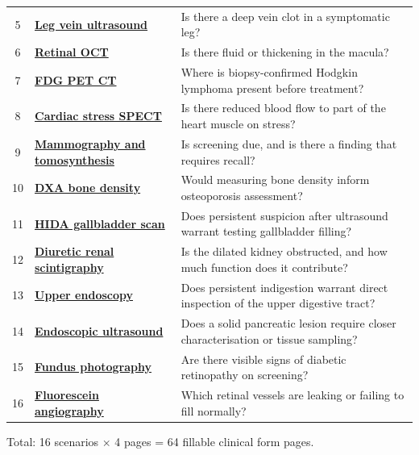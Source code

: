 \documentclass[10pt,a4paper]{article}
\begin{document}
\begin{Form}
\begin{tabularx}{\linewidth}{@{}c >{\bfseries\color{Navy}}p{4.6cm} X@{}}
5 & \hyperlink{scen5}{Leg vein ultrasound} & {\fontsize{8.3}{10}\selectfont Is there a deep vein clot in a symptomatic leg?} \\
6 & \hyperlink{scen6}{Retinal OCT} & {\fontsize{8.3}{10}\selectfont Is there fluid or thickening in the macula?} \\
7 & \hyperlink{scen7}{FDG PET CT} & {\fontsize{8.3}{10}\selectfont Where is biopsy-confirmed Hodgkin lymphoma present before treatment?} \\
8 & \hyperlink{scen8}{Cardiac stress SPECT} & {\fontsize{8.3}{10}\selectfont Is there reduced blood flow to part of the heart muscle on stress?} \\
9 & \hyperlink{scen9}{Mammography and tomosynthesis} & {\fontsize{8.3}{10}\selectfont Is screening due, and is there a finding that requires recall?} \\
10 & \hyperlink{scen10}{DXA bone density} & {\fontsize{8.3}{10}\selectfont Would measuring bone density inform osteoporosis assessment?} \\
11 & \hyperlink{scen11}{HIDA gallbladder scan} & {\fontsize{8.3}{10}\selectfont Does persistent suspicion after ultrasound warrant testing gallbladder filling?} \\
12 & \hyperlink{scen12}{Diuretic renal scintigraphy} & {\fontsize{8.3}{10}\selectfont Is the dilated kidney obstructed, and how much function does it contribute?} \\
13 & \hyperlink{scen13}{Upper endoscopy} & {\fontsize{8.3}{10}\selectfont Does persistent indigestion warrant direct inspection of the upper digestive tract?} \\
14 & \hyperlink{scen14}{Endoscopic ultrasound} & {\fontsize{8.3}{10}\selectfont Does a solid pancreatic lesion require closer characterisation or tissue sampling?} \\
15 & \hyperlink{scen15}{Fundus photography} & {\fontsize{8.3}{10}\selectfont Are there visible signs of diabetic retinopathy on screening?} \\
16 & \hyperlink{scen16}{Fluorescein angiography} & {\fontsize{8.3}{10}\selectfont Which retinal vessels are leaking or failing to fill normally?} \\
\bottomrule
\end{tabularx}
\vfill
{\fontsize{8}{10}\selectfont\color{Muted} Total: 16 scenarios $\times$ 4 pages = 64 fillable clinical form pages.}
\newpage


\end{Form}
\end{document}

